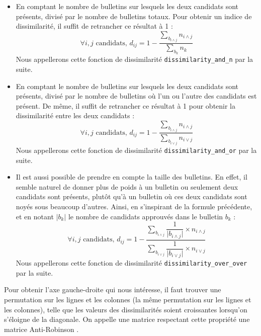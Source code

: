 \documentclass[11pt, a4paper]{article}
\newcommand{\somme}[2]{\underset{#1}{\overset{#2}{\sum}}}
\begin{document}
\medskip
\begin{itemize}
\item En comptant le nombre de bulletins sur lesquels les deux candidats sont pr\'{e}sents, divis\'{e} par le nombre de bulletins totaux. Pour obtenir un indice de dissimilarité, il suffit de retrancher ce r\'{e}sultat \`{a} 1 :
\[
\forall i, j\text{ candidats, } d_{ij} = 1 - \dfrac{\somme{b_{i \wedge j}}{} n_{i \wedge j}}{\somme{b_k}{} n_k}
\]
Nous appellerons cette fonction de dissimilarité \texttt{dissimilarity\_and\_n} par la suite.

\medskip
\item En comptant le nombre de bulletins sur lesquels les deux candidats sont pr\'{e}sents, divis\'{e} par le nombre de bulletins o\`{u} l'un ou l'autre des candidats est pr\'{e}sent. De m\^{e}me, il suffit de retrancher ce r\'{e}sultat \`{a} 1 pour obtenir la dissimilarit\'{e} entre les deux candidats :
\[
\forall i, j\text{ candidats, } d_{ij} = 1 - \dfrac{\somme{b_{i \wedge j}}{} n_{i \wedge j}}{\somme{b_{i \vee j}}{} n_{i \vee j}}
\]
Nous appellerons cette fonction de dissimilarité \texttt{dissimilarity\_and\_or} par la suite.

\medskip
\item Il est aussi possible de prendre en compte la taille des bulletins. En effet, il semble naturel de donner plus de poids à un bulletin ou seulement deux candidats sont présents, plutôt qu'à un bulletin où ces deux candidats sont noyés sous beaucoup d'autres. Ainsi, en s'inspirant de la formule précédente, et en notant $\vert b_k \vert$ le nombre de candidats approuvés dans le bulletin $b_k$ :
\[
\forall i, j\text{ candidats, } d_{ij} = 1 - \dfrac{\somme{b_{i \wedge j}}{} \dfrac{1}{\vert b_{i \wedge j} \vert} \times n_{i \wedge j}}{\somme{b_{i \vee j}}{} \dfrac{1}{\vert b_{i \vee j}\vert} \times n_{i \vee j}}
\]
Nous appellerons cette fonction de dissimilarité \texttt{dissimilarity\_over\_over} par la suite.
\end{itemize}

\bigskip
Pour obtenir l'axe gauche-droite qui nous int\'{e}resse, il faut trouver une permutation sur les lignes et les colonnes (la m\^{e}me permutation sur les lignes et les colonnes), telle que les valeurs des dissimilarit\'{e}s soient croissantes lorsqu'on s'\'{e}loigne de la diagonale. On appelle une matrice respectant cette propriété une matrice \og Anti-Robinson \fg{}.
\end{document}
